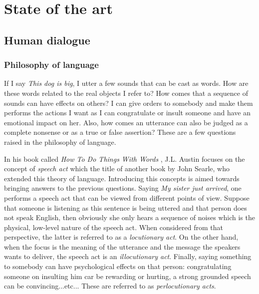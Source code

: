 \chapter{State of the art}

\label{ch:stateofart}

\section{Human dialogue}
	\subsection{Philosophy of language}
    \label{soa:philolang}
    
    
    	If I say \textit{This dog is big}, I utter a few sounds that can be cast as words. How are these words related to the real objects I refer to? How comes that a sequence of sounds can have effects on others? I can give orders to somebody and make them performs the actions I want as I can congratulate or insult someone and have an emotional impact on her. Also, how comes an utterance can also be judged as a complete nonsense or as a true or false assertion? These are a few questions raised in the philosophy of language.
    
    	In his book called \textit{How To Do Things With Words} \cite{Austin1962}, J.L. Austin focuses on the concept of \textit{speech act} which the title of another book \cite{Searle1969} by John Searle, who extended this theory of language. Introducing this concepts is aimed towards bringing answers to the previous questions. Saying \textit{My sister just arrived}, one performs a speech act that can be viewed from different points of view. Suppose that someone is listening as this sentence is being uttered and that person does not speak English, then obviously she only hears a sequence of noises which is the physical, low-level nature of the speech act. When considered from that perspective, the latter is referred to as a \textit{locutionary act}. On the other hand, when the focus is the meaning of the utterance and the message the speakers wants to deliver, the speech act is an \textit{illocutionary act}. Finally, saying something to somebody can have psychological effects on that person: congratulating someone on insulting him car be rewarding or hurting, a strong grounded speech can be convincing...etc... These are referred to as \textit{perlocutionary acts}.
        
